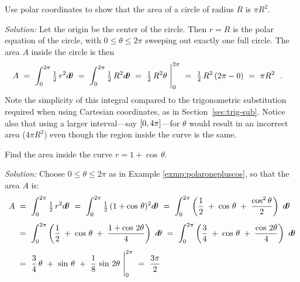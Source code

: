 \newpage
\begin{exmp}
\noindent Use polar coordinates to show that the area of a circle of radius $R$
is $\pi R^2$.\vspace{1mm}
\par\noindent\emph{Solution:} Let the origin be the center of the circle. Then
$r=R$ is the polar equation of the circle, with $0 \le \theta \le 2\pi$ sweeping
out exactly one full circle. The area $A$ inside the circle is then
\[
A ~=~ \int_{0}^{2\pi} \tfrac{1}{2}\,r^2 d\!\theta ~=~
\int_{0}^{2\pi} \tfrac{1}{2}\,R^2 d\!\theta ~=~
\tfrac{1}{2}\,R^2 \theta~\Biggr|_0^{2\pi} ~=~ \tfrac{1}{2}\,R^2\,(2\pi - 0) ~=~
\pi R^2 ~~.\quad\relax
\]
Note the simplicity of this integral compared to the trigonometric substitution
required when using Cartesian coordinates, as in Section~\ref{sec:trig-sub}. Notice also that
using a larger interval---say $\lbrack 0,4\pi \rbrack$---for $\theta$ would result in an
incorrect area ($4\pi R^2$) even though the region inside the curve is the same.
\end{exmp}
\begin{exmp}
\noindent Find the area inside the curve $r = 1 + \cos\,\theta$.\vspace{1mm}
\par\noindent\emph{Solution:} Choose $0 \le \theta \le 2\pi$ as in Example
\ref{exmp:polaronepluscos}, so that the area
$A$ is:
\begin{align*}
A ~&=~ \int_{0}^{2\pi} \tfrac{1}{2}\,r^2 d\!\theta ~=~
\int_{0}^{2\pi} \tfrac{1}{2}\,(1 + \cos\,\theta)^2 d\!\theta
~=~ \int_{0}^{2\pi} \left(\frac{1}{2} \;+\; \cos\,\theta \;+\;
    \frac{\cos^2 \theta}{2} \right)~d\!\theta\\[4pt]
&=~ \int_{0}^{2\pi} \left(\frac{1}{2} \;+\; \cos\,\theta \;+\;
    \frac{1 + \cos\,2\theta}{4} \right)~d\!\theta
~=~ \int_{0}^{2\pi} \left(\frac{3}{4} \;+\; \cos\,\theta \;+\;
    \frac{\cos\,2\theta}{4} \right)~d\!\theta\\[4pt]
&=~ \frac{3}{4}\,\theta ~+~ \sin\,\theta ~+~ \frac{1}{8}\,\sin\,2\theta~\Biggr|_0^{2\pi} ~=~
\frac{3\pi}{2}
\end{align*}
\end{exmp}
\divider

